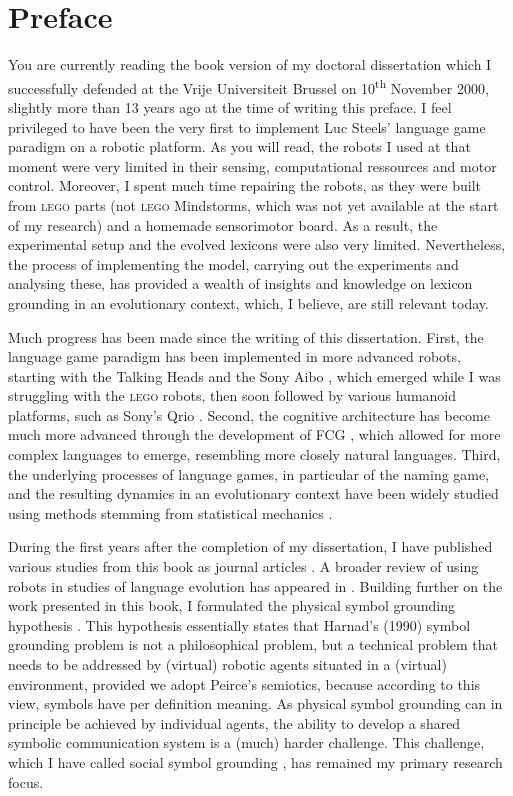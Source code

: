 \chapter*{Preface}

You are currently reading the book version of my doctoral dissertation which I successfully defended at the Vrije Universiteit Brussel on 10\textsuperscript{th} November 2000, slightly more than 13 years ago at the time of writing this preface. I feel privileged to have been the very first to implement Luc Steels' language game paradigm on a robotic platform. As you will read, the robots I used at that moment were very limited in their sensing, computational ressources and motor control. Moreover, I spent much time repairing the robots, as they were built from \textsc{lego} parts (not \textsc{lego} Mindstorms, which was not yet available at the start of my research) and a homemade sensorimotor board. As a result, the experimental setup and the evolved lexicons were also very limited. Nevertheless, the process of implementing the model, carrying out the experiments and analysing these, has provided a wealth of insights and knowledge on lexicon grounding in an evolutionary context, which, I believe, are still relevant today.

Much progress has been made since the writing of this dissertation. First, the language game paradigm has been implemented in more advanced robots, starting with the Talking Heads \citep{steelsetal:2002} and the Sony Aibo \citep{steelskaplan:2000}, which emerged while I was struggling with the \textsc{lego} robots, then soon followed by various humanoid platforms, such as Sony's Qrio \citep[see, e.g., ][ and this book series]{steels:2012}. Second, the cognitive architecture has become much more advanced through the development of FCG \citep{steelsdebeule:2006}, which allowed for more complex languages to emerge, resembling more closely natural languages. Third, the underlying processes of language games, in particular of the naming game, and the resulting dynamics in an evolutionary context have been widely studied using methods stemming from statistical mechanics \citep[e.g., ][]{baronchellietal:2006a}.

During the first years after the completion of my dissertation, I have published various studies from this book as journal articles \citep{vogt:2000c,vogt:2002a,vogt:2003a}. A broader review of using robots in studies of language evolution has appeared in \citet{vogt:2006a}. Building further on the work presented in this book, I formulated the {\sc physical symbol grounding hypothesis} \citep{vogt:2002a}. This hypothesis essentially states that Harnad's (1990) symbol grounding problem is not a philosophical problem, but a technical problem that needs to be addressed by (virtual) robotic agents situated in a (virtual) environment, provided we adopt Peirce's semiotics, because according to this view, symbols have per definition meaning. As physical symbol grounding can in principle be achieved by individual agents, the ability to develop a shared symbolic communication system is a (much) harder challenge. This challenge, which I have called {\sc social symbol grounding} \citep{vogtdivina:2007}, has remained my primary research focus.

